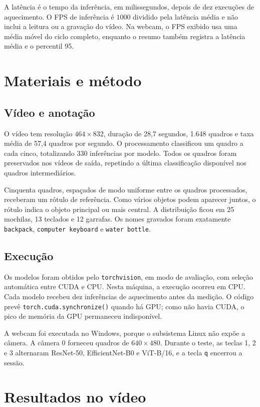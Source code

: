 \documentclass[12pt,a4paper]{article}
\begin{document}
A latência é o tempo da inferência, em milissegundos, depois de dez execuções de
aquecimento. O FPS de inferência é \(1000\) dividido pela latência média e não inclui
a leitura ou a gravação do vídeo. Na webcam, o FPS exibido usa uma média móvel do
ciclo completo, enquanto o resumo também registra a latência média e o percentil 95.

\section{Materiais e método}

\subsection{Vídeo e anotação}

O vídeo tem resolução \(464 \times 832\), duração de 28,7 segundos, 1.648 quadros e
taxa média de 57,4 quadros por segundo. O processamento classificou um quadro a cada
cinco, totalizando 330 inferências por modelo. Todos os quadros foram preservados nos
vídeos de saída, repetindo a última classificação disponível nos quadros intermediários.

Cinquenta quadros, espaçados de modo uniforme entre os quadros processados, receberam
um rótulo de referência. Como vários objetos podem aparecer juntos, o rótulo indica o
objeto principal ou mais central. A distribuição ficou em 25 mochilas, 13 teclados e
12 garrafas. Os nomes gravados foram exatamente \texttt{backpack},
\texttt{computer keyboard} e \texttt{water bottle}.

\subsection{Execução}

Os modelos foram obtidos pelo \texttt{torchvision}, em modo de avaliação, com seleção
automática entre CUDA e CPU. Nesta máquina, a execução ocorreu em CPU. Cada modelo
recebeu dez inferências de aquecimento antes da medição. O código prevê
\texttt{torch.cuda.synchronize()} quando há GPU; como não havia CUDA, o pico de memória
da GPU permaneceu indisponível.

A webcam foi executada no Windows, porque o subsistema Linux não expõe a câmera.
A câmera 0 forneceu quadros de \(640 \times 480\). Durante o teste, as teclas 1, 2 e 3
alternaram ResNet-50, EfficientNet-B0 e ViT-B/16, e a tecla \texttt{q} encerrou a sessão.

\section{Resultados no vídeo}
\end{document}
